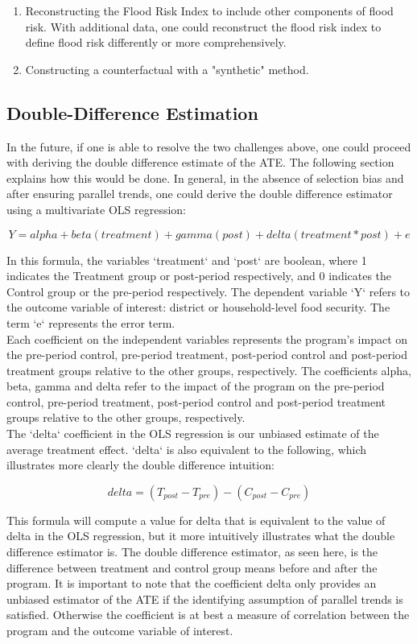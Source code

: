 \begin{enumerate}
  \item Reconstructing the Flood Risk Index to include other components of flood risk. With additional data, one could reconstruct the flood risk index to define flood risk differently or more comprehensively.
  \item Constructing a counterfactual with a "synthetic" method.
\end{enumerate}

\subsection{Double-Difference Estimation}

In the future, if one is able to resolve the two challenges above, one could proceed with deriving the double difference estimate of the ATE. The following section explains how this would be done. In general, in the absence of selection bias and after ensuring parallel trends, one could derive the double difference estimator using a multivariate OLS regression:

\[ Y = alpha + beta (treatment) + gamma (post) + delta (treatment * post) + e \]

In this formula, the variables `treatment` and `post` are boolean, where 1 indicates the Treatment group or post-period respectively, and 0 indicates the Control group or the pre-period respectively. The dependent variable `Y` refers to the outcome variable of interest: district or household-level food security. The term `e` represents the error term.\\

Each coefficient on the independent variables represents the program’s impact on the pre-period control, pre-period treatment, post-period control and post-period treatment groups relative to the other groups, respectively. The coefficients alpha, beta, gamma and delta refer to the impact of the program on the pre-period control, pre-period treatment, post-period control and post-period treatment groups relative to the other groups, respectively.\\

The `delta` coefficient in the OLS regression is our unbiased estimate of the average treatment effect. `delta` is also equivalent to the following, which illustrates more clearly the double difference intuition:

\[ delta = (T_{post} - T_{pre}) - (C_{post} - C_{pre}) \]

This formula will compute a value for delta that is equivalent to the value of delta in the OLS regression, but it more intuitively illustrates what the double difference estimator is. The double difference estimator, as seen here, is the difference between treatment and control group means before and after the program. It is important to note that the coefficient delta only provides an unbiased estimator of the ATE if the identifying assumption of parallel trends is satisfied. Otherwise the coefficient is at best a measure of correlation between the program and the outcome variable of interest.
